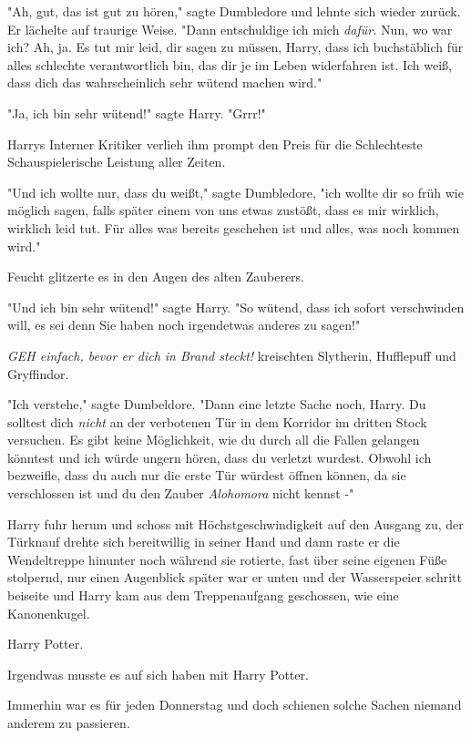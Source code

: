 {"Ah, gut, das ist gut zu hören," sagte Dumbledore und lehnte sich wieder zurück. Er lächelte auf traurige Weise. "Dann entschuldige ich mich \emph{dafür.} Nun, wo war ich? Ah, ja. Es tut mir leid, dir sagen zu müssen, Harry, dass ich buchstäblich für alles schlechte verantwortlich bin, das dir je im Leben widerfahren ist. Ich weiß, dass dich das wahrscheinlich sehr wütend machen wird."

"Ja, ich bin sehr wütend!" sagte Harry. "Grrr!"

Harrys Interner Kritiker verlieh ihm prompt den Preis für die Schlechteste Schauspielerische Leistung aller Zeiten.

"Und ich wollte nur, dass du weißt," sagte Dumbledore, "ich wollte dir so früh wie möglich sagen, falls später einem von uns etwas zustößt, dass es mir wirklich, wirklich leid tut. Für alles was bereits geschehen ist und alles, was noch kommen wird."

Feucht glitzerte es in den Augen des alten Zauberers.

"Und ich bin sehr wütend!" sagte Harry. "So wütend, dass ich sofort verschwinden will, es sei denn Sie haben noch irgendetwas anderes zu sagen!"

\emph{GEH einfach, bevor er dich in Brand steckt!} kreischten Slytherin, Hufflepuff und Gryffindor.

"Ich verstehe," sagte Dumbeldore. "Dann eine letzte Sache noch, Harry. Du solltest dich \emph{nicht} an der verbotenen Tür in dem Korridor im dritten Stock versuchen. Es gibt keine Möglichkeit, wie du durch all die Fallen gelangen könntest und ich würde ungern hören, dass du verletzt wurdest. Obwohl ich bezweifle, dass du auch nur die erste Tür würdest öffnen können, da sie verschlossen ist und du den Zauber \emph{Alohomora} nicht kennst -"

Harry fuhr herum und schoss mit Höchstgeschwindigkeit auf den Ausgang zu, der Türknauf drehte sich bereitwillig in seiner Hand und dann raste er die Wendeltreppe hinunter noch während sie rotierte, fast über seine eigenen Füße stolpernd, nur einen Augenblick später war er unten und der Wasserspeier schritt beiseite und Harry kam aus dem Treppenaufgang geschossen, wie eine Kanonenkugel.

\later

Harry Potter.

Irgendwas musste es auf sich haben mit Harry Potter.

Immerhin war es für jeden Donnerstag und doch schienen solche Sachen niemand anderem zu passieren.

}
